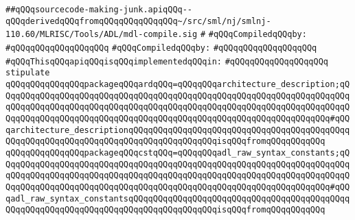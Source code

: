 \label{src/lib/compiler/back/low/tools/arch/sourcecode-making-junk.api}
\verb|##qQQqsourcecode-making-junk.apiqQQq--qQQqderivedqQQqfromqQQqqQQqqQQqqQQq~/src/sml/nj/smlnj-110.60/MLRISC/Tools/ADL/mdl-compile.sig|\newline
\verb|#|\newline
\newline
\verb|#qQQqCompiledqQQqby:|\newline
\verb|#qQQqqQQqqQQqqQQqqQQq|\newline
\newline
\newline
\verb|#qQQqCompiledqQQqby:|\newline
\verb|#qQQqqQQqqQQqqQQqqQQq|\newline
\newline
\verb|#qQQqThisqQQqapiqQQqisqQQqimplementedqQQqin:|\newline
\verb|#qQQqqQQqqQQqqQQqqQQq|\newline
\newline
\verb|stipulate|\newline
\verb|qQQqqQQqqQQqqQQqpackageqQQqardqQQq=qQQqqQQqarchitecture_description;qQQqqQQqqQQqqQQqqQQqqQQqqQQqqQQqqQQqqQQqqQQqqQQqqQQqqQQqqQQqqQQqqQQqqQQqqQQqqQQqqQQqqQQqqQQqqQQqqQQqqQQqqQQqqQQqqQQqqQQqqQQqqQQqqQQqqQQqqQQqqQQqqQQqqQQqqQQqqQQqqQQqqQQqqQQqqQQqqQQqqQQqqQQqqQQqqQQqqQQqqQQqqQQq#qQQqarchitecture_descriptionqQQqqQQqqQQqqQQqqQQqqQQqqQQqqQQqqQQqqQQqqQQqqQQqqQQqqQQqqQQqqQQqqQQqqQQqqQQqqQQqqQQqqQQqisqQQqfromqQQqqQQqqQQq|\newline
\verb|qQQqqQQqqQQqqQQqpackageqQQqcstqQQq=qQQqqQQqadl_raw_syntax_constants;qQQqqQQqqQQqqQQqqQQqqQQqqQQqqQQqqQQqqQQqqQQqqQQqqQQqqQQqqQQqqQQqqQQqqQQqqQQqqQQqqQQqqQQqqQQqqQQqqQQqqQQqqQQqqQQqqQQqqQQqqQQqqQQqqQQqqQQqqQQqqQQqqQQqqQQqqQQqqQQqqQQqqQQqqQQqqQQqqQQqqQQqqQQqqQQqqQQqqQQqqQQqqQQq#qQQqadl_raw_syntax_constantsqQQqqQQqqQQqqQQqqQQqqQQqqQQqqQQqqQQqqQQqqQQqqQQqqQQqqQQqqQQqqQQqqQQqqQQqqQQqqQQqqQQqqQQqisqQQqfromqQQqqQQqqQQq|\newline
